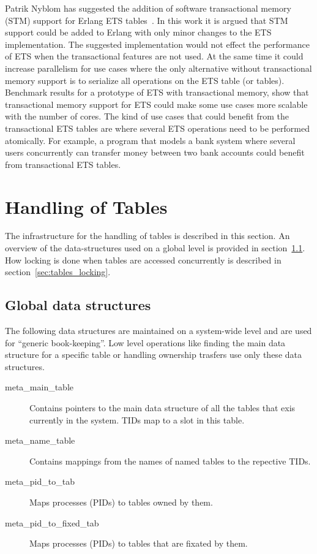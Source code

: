 \documentclass[aps,pre,preprint,nofootinbib]{revtex4}
\begin{document}
  Patrik Nyblom has suggested the addition of software transactional memory (STM) support for Erlang ETS tables~\cite{PatrikErlangTrans}.
  In this work it is argued that STM support could be added to Erlang with only minor changes to the ETS implementation.
  The suggested implementation would not effect the performance of ETS when the transactional features are not used.
  At the same time it could increase parallelism for use cases where the only alternative without transactional memory support is to serialize all operations on the ETS table (or tables).
  Benchmark results for a prototype of ETS with transactional memory, show that transactional memory support for ETS could make some use cases more scalable with the number of cores.
  The kind of use cases that could benefit from the transactional ETS tables are where several ETS operations need to be performed atomically.
  For example, a program that models a bank system where several users concurrently can transfer money between two bank accounts could benefit from transactional ETS tables.
  

\section{Handling of Tables}

The infrastructure for the handling of tables is described in this section. 
An overview of the data-structures used on a global level is provided in section~\ref{sec:tables_overview}.
How locking is done when tables are accessed concurrently is described in section~\ref{sec:tables_locking}.

\subsection{Global data structures}
\label{sec:tables_overview}

The following data structures are maintained on a system-wide level and are used for ``generic book-keeping''.
Low level operations like finding the main data structure for a specific table or handling ownership trasfers use only these data structures.  

\begin{description}
\item[meta\_main\_table]
  Contains pointers to the main data structure of all the tables that exis currently in the system.
  TIDs map to a slot in this table.
\item[meta\_name\_table]
  Contains mappings from the names of named tables to the repective TIDs.
\item[meta\_pid\_to\_tab]
  Maps processes (PIDs) to tables owned by them.
\item[meta\_pid\_to\_fixed\_tab]
  Maps processes (PIDs) to tables that are fixated by them.
\end{description}
\end{document}
